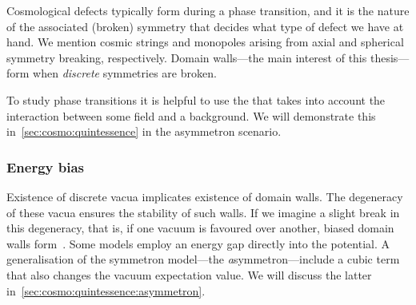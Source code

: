 


    
    Cosmological defects typically form during a phase transition, and it is the nature of the associated (broken) symmetry that decides what type of defect we have at hand. We mention cosmic strings and monopoles arising from axial and spherical symmetry breaking, respectively. Domain walls---the main interest of this thesis---form when \emph{discrete} symmetries are broken. 
    
    To study phase transitions it is helpful to use the  that takes into account the interaction between some field and a background. 
    We will demonstrate this in~\cref{sec:cosmo:quintessence} in the asymmetron scenario.







    \subsubsection{Energy bias}
        Existence of discrete vacua implicates existence of domain walls. The degeneracy of these vacua ensures the stability of such walls. If we imagine a slight break in this degeneracy, that is, if one vacuum is favoured over another, biased domain walls form~\citep{vachaspatiKinksDomainWalls2006}. Some models employ an energy gap directly into the potential. A generalisation of the symmetron model---the \emph{a}symmetron---include a cubic term that also changes the vacuum expectation value. We will discuss the latter in~\cref{sec:cosmo:quintessence:asymmetron}.







    



    
    




    